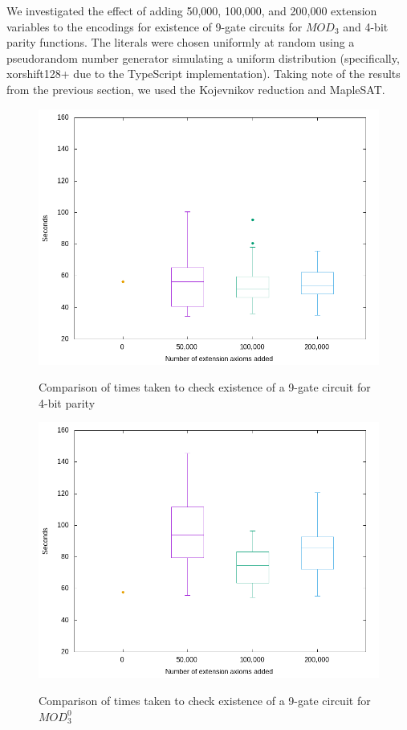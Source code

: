 \documentclass{article}
\begin{document}
We investigated the effect of adding 50,000, 100,000, and 200,000 extension variables to the encodings for existence of 9-gate circuits for \(MOD_3\) and 4-bit parity functions. The literals were chosen uniformly at random using a pseudorandom number generator simulating a uniform distribution (specifically, xorshift128+ due to the TypeScript implementation). Taking note of the results from the previous section, we used the Kojevnikov reduction and MapleSAT.

\begin{figure}[!ht]
  \includegraphics[width=\textwidth]{images/extvars/boxplot_4parity_medians.png}
  \label{fig:extparity}
  \caption{Comparison of times taken to check existence of a 9-gate circuit for 4-bit parity}
\end{figure}

\begin{figure}[!ht]
  \includegraphics[width=\textwidth]{images/extvars/boxplot_4mod3_medians.png}
  \label{fig:extmod3}
  \caption{Comparison of times taken to check existence of a 9-gate circuit for \(MOD^0_3\)}
\end{figure}
\end{document}
